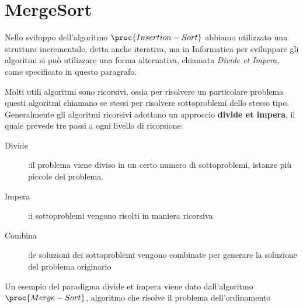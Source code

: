 \section{MergeSort}
Nello sviluppo dell'algoritmo $\proc{Insertion-Sort}$ abbiamo utilizzato una
struttura incrementale, detta anche iterativa, ma in Informatica per sviluppare
gli algoritmi si può utilizzare una forma alternativa, chiamata \emph{Divide et Impera},
come specificato in questo paragrafo.

Molti utili algoritmi sono ricorsivi, ossia per risolvere un particolare problema
questi algoritmi chiamano se stessi per risolvere sottoproblemi dello stesso tipo.
Generalmente gli algoritmi ricorsivi adottano un approccio \textbf{divide et impera},
il quale prevede tre passi a ogni livello di ricorsione:
\begin{description}
    \item[Divide]:il problema viene diviso in un certo numero di sottoproblemi, istanze
                  più piccole del problema.
    \item[Impera]:i sottoproblemi vengono risolti in maniera ricorsiva
    \item[Combina]:le soluzioni dei sottoproblemi vengono combinate per generare
                   la soluzione del problema originario
\end{description}
Un esempio del paradigma divide et impera viene dato dall'algoritmo $\proc{Merge-Sort}$,
algoritmo che risolve il problema dell'ordinamento

